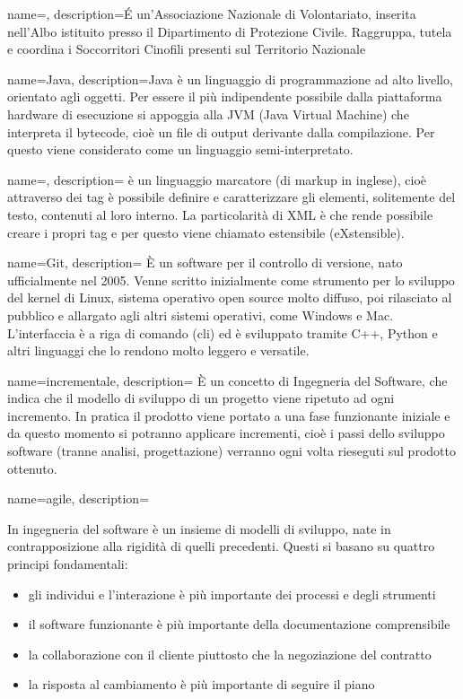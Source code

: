 {
  name=, 
  description={É un'Associazione Nazionale di Volontariato,
    inserita nell'Albo istituito presso il Dipartimento di Protezione Civile. Raggruppa, tutela e coordina i Soccorritori Cinofili presenti
    sul Territorio Nazionale}
}

{
  name=Java, 
  description={Java è un linguaggio di programmazione ad alto livello, orientato agli oggetti. Per essere il più indipendente
    possibile dalla piattaforma hardware di esecuzione si appoggia alla JVM (Java Virtual Machine) che interpreta il bytecode, cioè un file di
    output derivante dalla compilazione. Per questo viene considerato come un linguaggio semi-interpretato.
  }
}

{
  name=,
  description={ è un linguaggio marcatore (di markup in inglese), cioè attraverso dei tag è possibile definire e caratterizzare gli elementi,
  solitemente del testo, contenuti al loro interno. La particolarità di XML è che rende possibile creare i propri tag e per questo viene
  chiamato estensibile (eXstensible). }
}

{
  name=Git,
  description={ È un software per il controllo di versione, nato ufficialmente nel 2005. Venne scritto inizialmente come strumento per lo
  sviluppo del kernel di Linux, sistema operativo open source molto diffuso, poi rilasciato al pubblico e allargato agli altri sistemi
  operativi, come Windows e Mac. L'interfaccia è a riga di comando (\gls{cli}) ed è sviluppato tramite C++, Python e altri linguaggi che lo
  rendono molto leggero e versatile. }
}

{
  name=incrementale,
  description={ È un concetto di Ingegneria del Software, che indica che il modello di sviluppo di un progetto viene ripetuto ad ogni
  incremento. In pratica il prodotto viene portato a una fase funzionante iniziale e da questo momento si potranno applicare incrementi,
  cioè i passi dello sviluppo software (tranne analisi, progettazione) verranno ogni volta rieseguti sul prodotto ottenuto. }
}

{
  name=agile,
  description={ In ingegneria del software è un insieme di modelli di sviluppo, nate in contrapposizione alla rigidità di quelli precedenti.
  Questi si basano su quattro principi fondamentali: \begin{itemize}
    \item gli individui e l'interazione è più importante dei processi e degli strumenti
    \item il software funzionante è più importante della documentazione comprensibile
    \item la collaborazione con il cliente piuttosto che la negoziazione del contratto
    \item la risposta al cambiamento è più importante di seguire il piano
  \end{itemize}}
}

